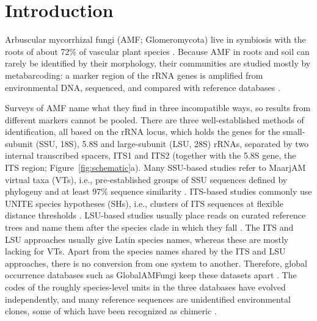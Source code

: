 \documentclass[11pt]{article}
\begin{document}
\begin{abstract}
.~Novelty can be inferred from rRNA genes only where the markers separate species, and error rates hold only for the
reference databases used. For diversity analyses, divergent copies should be recognized before taxa are counted, and
inseparable species should be reported as complexes.

\vspace{0.6em}
\noindent
\textbf{Keywords.} arbuscular mycorrhizal fungi; Glomeromycota; rRNA gene intragenomic variation; MaarjAM virtual
taxa; UNITE species hypotheses; novelty detection; phylogenetic placement; long-read metabarcoding.
\end{abstract}

\section{Introduction}
Arbuscular mycorrhizal fungi (AMF; Glomeromycota) live in symbiosis with the roots of about 72\% of vascular plant
species \cite{brundrett2018evolutionary}. Because AMF in roots and soil can rarely be identified by their
morphology, their communities are studied mostly by metabarcoding: a marker region of the rRNA genes is amplified
from environmental DNA, sequenced, and compared with reference databases
\cite{opik2010maarjam,davison2015global,vetrovsky2023globalamfungi}.

Surveys of AMF name what they find in three incompatible ways, so results from different markers cannot be pooled.
There are three well-established methods of identification, all based on the rRNA locus, which holds the genes for
the small-subunit (SSU, 18S), 5.8S and large-subunit (LSU, 28S) rRNAs, separated by two internal transcribed
spacers, ITS1 and ITS2 (together with the 5.8S gene, the ITS region; Figure~\ref{fig:schematic}a). Many SSU-based
studies refer to MaarjAM virtual taxa (VTs), i.e., pre-established groups of SSU sequences defined by phylogeny and
at least 97\% sequence similarity \cite{opik2010maarjam,opik2014virtual}. ITS-based studies commonly use UNITE
species hypotheses (SHs), i.e., clusters of ITS sequences at flexible distance thresholds
\cite{koljalg2013unified,nilsson2019unite}. LSU-based studies usually place reads on curated reference trees and
name them after the species clade in which they fall
\cite{kruger2012phylogenetic,delavaux2021lsu,delavaux2022lsu,delavaux2024lsu}. The ITS and LSU approaches usually
give Latin species names, whereas these are mostly lacking for VTs. Apart from the species names shared by the ITS
and LSU approaches, there is no conversion from one system to another. Therefore, global occurrence databases such
as GlobalAMFungi keep these datasets apart \cite{vetrovsky2023globalamfungi}. The codes of the roughly
species-level units in the three databases have evolved independently, and many reference sequences are
unidentified environmental clones, some of which have been recognized as chimeric \cite{tedersoo2024eukaryome}.
\end{document}
